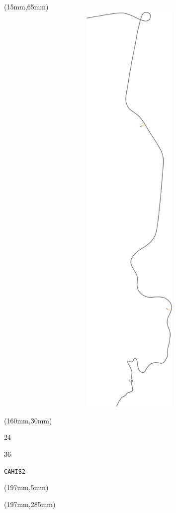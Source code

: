 \begin{textblock*}{185mm}(15mm,65mm)%
\centering
\mbox{\includegraphics[width=185mm,height=210mm,keepaspectratio]{PT/CAHIS2.pdf}}
\end{textblock*}
\begin{textblock*}{40mm}(160mm,30mm)%
\Large
\par{} 
\par24 
\par36 
\par\hfill\tiny\tt CAHIS2\\
\end{textblock*}
\begin{textblock*}{20mm}(197mm,5mm)%
\fbox{\thepage}
\label{CAHIS2}
\end{textblock*}
\begin{textblock*}{20mm}(197mm,285mm)%
\fbox{\thepage}
\end{textblock*}

